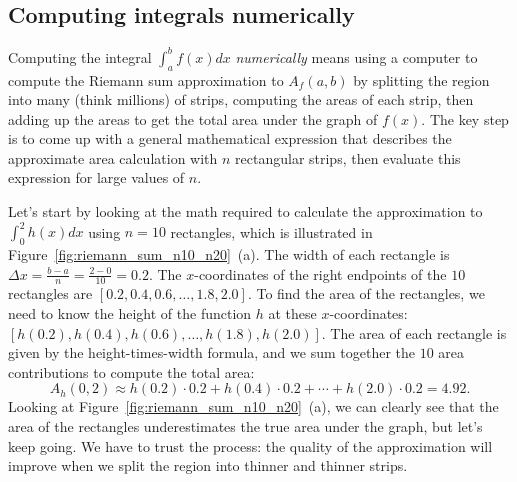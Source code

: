 

\vspace{-3mm} %

	\subsection{Computing integrals numerically}
	\label{integrals:computing_integrals_numerically}

\vspace{-2mm} %

		Computing the integral $\int_{a}^b f(x)dx$ \emph{numerically}
		means using a computer to compute the Riemann sum approximation to $A_f(a,b)$
		by splitting the region into many (think millions) of strips,
		computing the areas of each strip,
		then adding up the areas to get the total area under the graph of $f(x)$.
		The key step is to come up with a general mathematical expression
		that describes the approximate area calculation with $n$ rectangular strips,
		then evaluate this expression for large values of $n$.

		Let's start by looking
		at the math required to calculate the approximation to $\int_{0}^2 h(x)dx$ using $n=10$ rectangles,
		which is illustrated in Figure~\ref{fig:riemann_sum_n10_n20}~(a).
		The width of each rectangle is $\Delta x = \frac{b-a}{n} = \frac{2-0}{10} = 0.2$.
		The $x$-coordinates of the right endpoints of the $10$ rectangles are $[0.2, 0.4, 0.6, \ldots, 1.8, 2.0]$.
		To find the area of the rectangles,
		we need to know the height of the function $h$ at these $x$-coordinates:
		$[h(0.2), h(0.4), h(0.6), \ldots, h(1.8), h(2.0)]$.
		The area of each rectangle is given by the height-times-width formula,
		and we sum together the $10$ area contributions
		to compute the total area:
		\[ 
			A_h(0,2)
			\approx
			h(0.2) \cdot 0.2
			+ h(0.4) \cdot 0.2
			+ \cdots
			+ h(2.0) \cdot 0.2
			= 4.92.
		\]
		Looking at Figure~\ref{fig:riemann_sum_n10_n20}~(a),
		we can clearly see that the area of the rectangles
		underestimates the true area under the graph,
		but let's keep going.
		We have to trust the process:
		the quality of the approximation will improve
		when we split the region into thinner and thinner strips.

